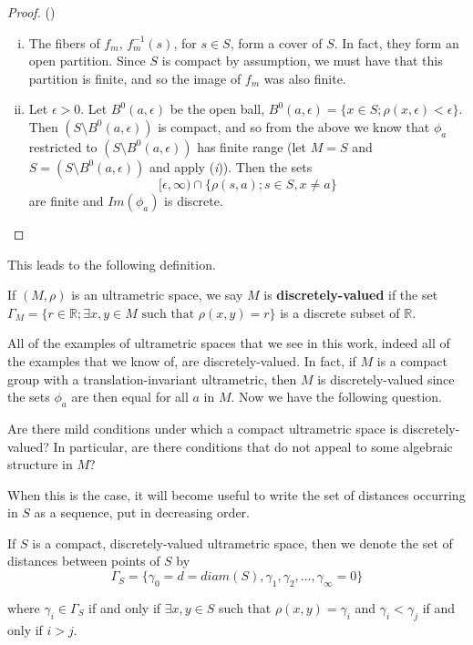 \begin{proof}
(\cite{ar}) 
\begin{enumerate}[(i)]
\item The fibers of $f_m$, $f_m^{-1}(s)$, for $s \in S$, form a cover of $S$. In fact, they form an open partition. Since $S$ is compact by assumption, we must have that this partition is finite, and so the image of $f_m$ was also finite.
\item Let $\epsilon >0$. Let $B^0(a,\epsilon)$ be the open ball, $B^0(a,\epsilon)= \{x \in S; \rho(x,\epsilon) < \epsilon\}$. Then $(S\setminus B^0(a,\epsilon))$ is compact, and so from the above we know that $\phi_{a}$ restricted to $(S\setminus B^0(a,\epsilon))$ has finite range (let $M = S$ and $S = (S\setminus B^0(a, \epsilon))$ and apply (\textit{i})). Then the sets \[ [\epsilon, \infty) \cap \{\rho(s,a); s \in S, x \neq a\} \] are finite and $Im(\phi_a)$ is discrete.
\end{enumerate}
\end{proof}

This leads to the following definition.\\

\begin{definition}
If $(M, \rho)$ is an ultrametric space, we say $M$ is \textbf{discretely-valued} if the set $\Gamma_M = \{r \in \mathbb{R}; \exists x,y \in M \text{ such that } \rho(x,y)=r\}$ is a discrete subset of $\mathbb{R}$.
\end{definition}

All of the examples of ultrametric spaces that we see in this work, indeed all of the examples that we know of, are discretely-valued. In fact, if $M$ is a compact group with  a translation-invariant ultrametric, then $M$ is discretely-valued since the sets $\phi_a$ are then equal for all $a$ in $M$. Now we have the following question.\\

\begin{question}
	Are there mild conditions under which a compact ultrametric space is discretely-valued? In particular, are there conditions that do not appeal to some algebraic structure in $M$?
\end{question}

When this is the case, it will become useful to write the set of distances occurring in $S$ as a sequence, put in decreasing order.\\

\begin{notation*}
	If $S$ is a compact, discretely-valued ultrametric space, then we denote the set of distances between points of $S$ by 
	$$\Gamma_S = \{\gamma_0 = d =diam(S), \gamma_1, \gamma_2, \ldots, \gamma_\infty =0 \}$$
	
	where $\gamma_i \in  \Gamma_S$ if and only if $\exists x,y \in S$ such that $\rho(x,y) = \gamma_i$ and  $\gamma_i < \gamma_j$ if and only if $i > j$. 
\end{notation*}


